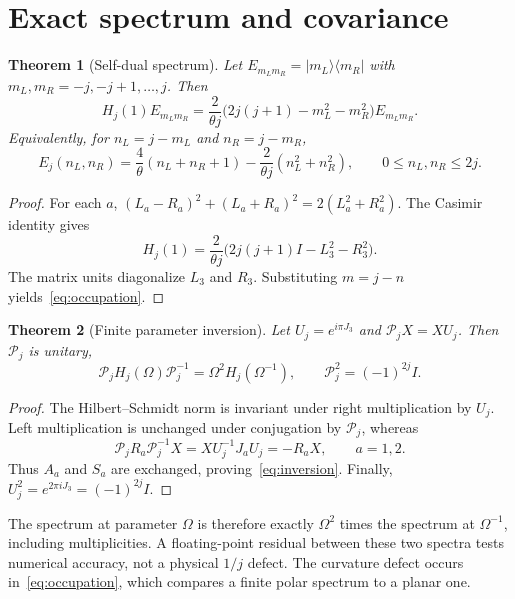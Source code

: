 \documentclass[11pt,a4paper]{article}
\newtheorem{theorem}{Theorem}[section]
\theoremstyle{remark}\newtheorem{remark}[theorem]{Remark}
\begin{document}
\section{Exact spectrum and covariance}
\begin{theorem}[Self-dual spectrum]\label{thm:spectrum}
Let $E_{m_Lm_R}=|m_L\rangle\langle m_R|$ with $m_L,m_R=-j,-j+1,\ldots,j$.
Then
\begin{equation}\label{eq:energy}
 H_j(1)E_{m_Lm_R}
 =\frac{2}{\theta j}\big(2j(j+1)-m_L^2-m_R^2\big)E_{m_Lm_R}.
\end{equation}
Equivalently, for $n_L=j-m_L$ and $n_R=j-m_R$,
\begin{equation}\label{eq:occupation}
 E_j(n_L,n_R)=\frac4\theta(n_L+n_R+1)
 -\frac2{\theta j}(n_L^2+n_R^2),\qquad 0\le n_L,n_R\le2j.
\end{equation}
\end{theorem}
\begin{proof}
For each $a$, $(L_a-R_a)^2+(L_a+R_a)^2=2(L_a^2+R_a^2)$.
The Casimir identity gives
\begin{equation}
 H_j(1)=\frac2{\theta j}
 \big(2j(j+1)I-L_3^2-R_3^2\big).
\end{equation}
The matrix units diagonalize $L_3$ and $R_3$.
Substituting $m=j-n$ yields~\eqref{eq:occupation}.
\end{proof}

\begin{theorem}[Finite parameter inversion]\label{thm:covariance}
Let $U_j=e^{i\pi J_3}$ and $\mathcal P_jX=XU_j$.
Then $\mathcal P_j$ is unitary,
\begin{equation}\label{eq:inversion}
 \mathcal P_jH_j(\Omega)\mathcal P_j^{-1}
 =\Omega^2H_j(\Omega^{-1}),\qquad
 \mathcal P_j^2=(-1)^{2j}I.
\end{equation}
\end{theorem}
\begin{proof}
The Hilbert--Schmidt norm is invariant under right multiplication by $U_j$.
Left multiplication is unchanged under conjugation by $\mathcal P_j$, whereas
\begin{equation}
 \mathcal P_jR_a\mathcal P_j^{-1}X
 =XU_j^{-1}J_aU_j=-R_aX,\qquad a=1,2.
\end{equation}
Thus $A_a$ and $S_a$ are exchanged, proving~\eqref{eq:inversion}.
Finally, $U_j^2=e^{2\pi iJ_3}=(-1)^{2j}I$.
\end{proof}

The spectrum at parameter $\Omega$ is therefore exactly $\Omega^2$ times the spectrum at $\Omega^{-1}$, including multiplicities.
A floating-point residual between these two spectra tests numerical accuracy, not a physical $1/j$ defect.
The curvature defect occurs in~\eqref{eq:occupation}, which compares a finite polar spectrum to a planar one.
\end{document}
